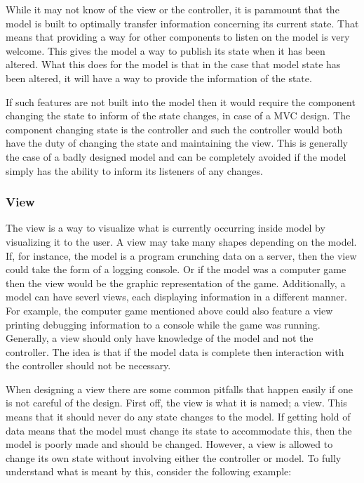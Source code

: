 While it may not know of the view or the controller, it is paramount
that the model is built to optimally transfer information concerning
its current state. That means that providing a way for other components
to listen on the model is very welcome\emph{. }This gives the model
a way to publish its state when it has been altered\emph{.} What this
does for the model is that in the case that model state has been altered,
it will have a way to provide the information of the state. 

If such features are not built into the model then it would require
the component changing the state to inform of the state changes, in
case of a MVC design. The component changing state is the controller
and such the controller would both have the duty of changing the state
and maintaining the view. This is generally the case of a badly designed
model and can be completely avoided if the model simply has the ability
to inform its listeners of any changes.


\subsubsection{View}

The view is a way to visualize what is currently occurring inside
model by visualizing it to the user. A view may take many shapes depending
on the model. If, for instance, the model is a program crunching data
on a server, then the view could take the form of a logging console.
Or if the model was a computer game then the view would be the graphic
representation of the game. Additionally, a model can have severl
views, each displaying information in a different manner. For example,
the computer game mentioned above could also feature a view printing
debugging information to a console while the game was running. Generally,
a view should only have knowledge of the model and not the controller.
The idea is that if the model data is complete then interaction with
the controller should not be necessary.

When designing a view there are some common pitfalls that happen easily
if one is not careful of the design. First off, the view is what it
is named; a view. This means that it should never do any state changes
to the model. If getting hold of data means that the model must change
its state to accommodate this, then the model is poorly made and should
be changed. However, a view is allowed to change its own state without
involving either the controller or model. To fully understand what
is meant by this, consider the following example:

